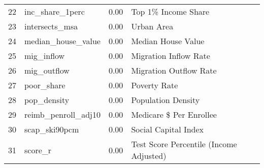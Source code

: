 \begin{table}[ht]
\begin{tabular}{rlrl}
  22 & inc\_share\_1perc & 0.00 & Top 1\% Income Share \\ 
  23 & intersects\_msa & 0.00 & Urban Area \\ 
  24 & median\_house\_value & 0.00 & Median House Value \\ 
  25 & mig\_inflow & 0.00 & Migration Inflow Rate \\ 
  26 & mig\_outflow & 0.00 & Migration Outflow Rate \\ 
  27 & poor\_share & 0.00 & Poverty Rate \\ 
  28 & pop\_density & 0.00 & Population Density \\ 
  29 & reimb\_penroll\_adj10 & 0.00 & Medicare \$ Per Enrollee \\ 
  30 & scap\_ski90pcm & 0.00 & Social Capital Index \\ 
  31 & score\_r & 0.00 & Test Score Percentile (Income Adjusted) \\ 
   \hline
\end{tabular}
\end{table}
